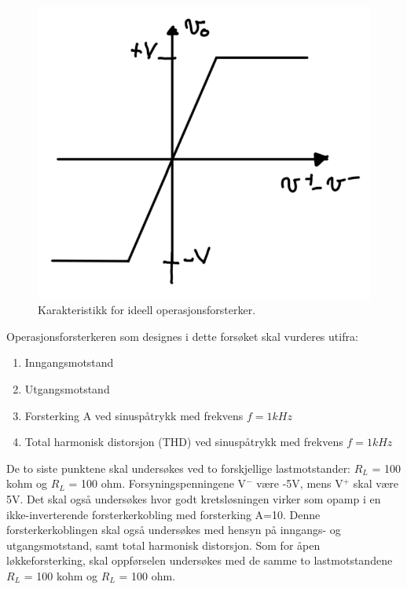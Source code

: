 \begin{figure}[H]
	\centering
	\includegraphics[scale=0.5]{./Images/01Issue/02_karakteristikk.png}
	\caption{ Karakteristikk for ideell operasjonsforsterker.}
	\label{fig:02karakteristikk}
\end{figure}

Operasjonsforsterkeren som designes i dette forsøket skal vurderes utifra:

\begin{enumerate}
	\item Inngangsmotstand
	\item Utgangsmotstand
	\item Forsterking A ved sinuspåtrykk med frekvens $f = 1 kHz$
	\item Total harmonisk distorsjon (THD) ved sinuspåtrykk med frekvens $f = 1 kHz$
\end{enumerate}

De to siste punktene skal undersøkes ved to forskjellige lastmotstander: $R_L$ = 100 kohm og $R_L$ = 100 ohm. 
\newline Forsyningspenningene V$^-$ være -5V, mens V$^+$ skal være 5V. 
\newline Det skal også undersøkes hvor godt kretsløsningen virker som opamp i en ikke-inverterende forsterkerkobling med forsterking A=10. Denne forsterkerkoblingen skal også undersøkes med hensyn på inngangs- og utgangsmotstand, samt total harmonisk distorsjon. Som for åpen løkkeforsterking, skal oppførselen undersøkes med de samme to lastmotstandene $R_L$ = 100 kohm og $R_L$ = 100 ohm.